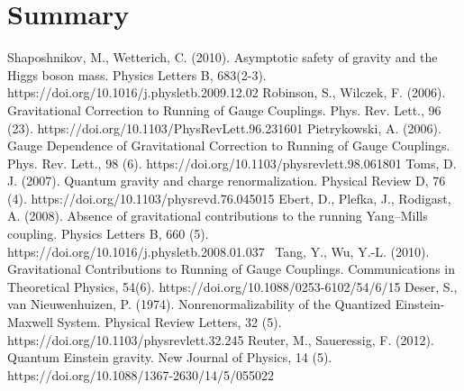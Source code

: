 \documentclass[11pt, a4paper]{article}
\begin{document}
\section*{Summary}

\begin{thebibliography}{9}
    Shaposhnikov, M., Wetterich, C. (2010). Asymptotic safety of gravity and the Higgs boson mass. Physics Letters B, 683(2-3). https://doi.org/10.1016/j.physletb.2009.12.02    
    Robinson, S., Wilczek, F. (2006). Gravitational Correction to Running of Gauge Couplings. Phys. Rev. Lett., 96 (23). https://doi.org/10.1103/PhysRevLett.96.231601
    Pietrykowski, A. (2006). Gauge Dependence of Gravitational Correction to Running of Gauge Couplings. Phys. Rev. Lett., 98 (6). https://doi.org/10.1103/physrevlett.98.061801
    Toms, D. J. (2007). Quantum gravity and charge renormalization. Physical Review D, 76 (4). https://doi.org/10.1103/physrevd.76.045015
    Ebert, D., Plefka, J., Rodigast, A. (2008). Absence of gravitational contributions to the running Yang–Mills coupling. Physics Letters B, 660 (5). https://doi.org/10.1016/j.physletb.2008.01.037 
    Tang, Y., Wu, Y.-L. (2010). Gravitational Contributions to Running of Gauge Couplings. Communications in Theoretical Physics, 54(6). https://doi.org/10.1088/0253-6102/54/6/15
    Deser, S., van Nieuwenhuizen, P. (1974). Nonrenormalizability of the Quantized Einstein-Maxwell System. Physical Review Letters, 32 (5). https://doi.org/10.1103/physrevlett.32.245
    Reuter, M., Saueressig, F. (2012). Quantum Einstein gravity. New Journal of Physics, 14 (5). https://doi.org/10.1088/1367-2630/14/5/055022
\end{thebibliography}
\end{document}
